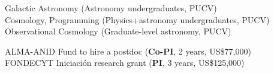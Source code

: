 \documentclass[11pt]{article}
\begin{document}
\noindent
{} Galactic Astronomy (Astronomy undergraduates, PUCV)\\
 Cosmology, Programming (Physics+astronomy undergraduates, PUCV)\\
 Observational Cosmology (Graduate-level astronomy, PUCV)\\



\hline

\pagebreak


\noindent
{} ALMA-ANID Fund to hire a postdoc (\textbf{Co-PI}, 2 years, US\$77,000)\\
 FONDECYT Iniciaci\'on research grant (\textbf{PI}, 3 years, US\$125,000)



%
\end{document}
